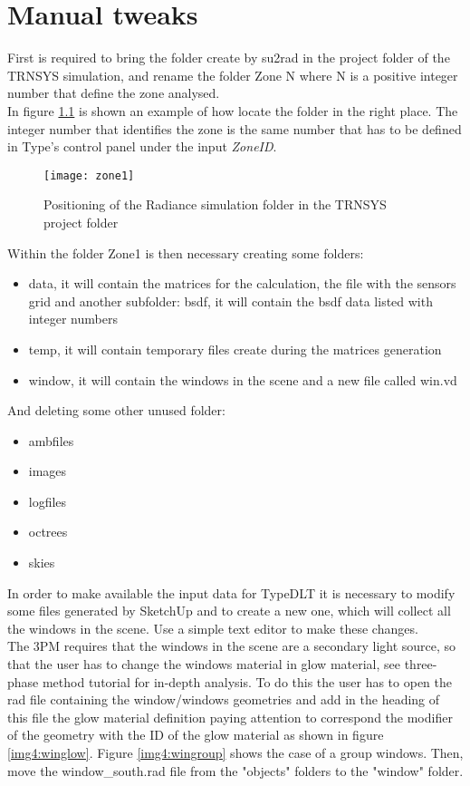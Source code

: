 \chapter{Manual tweaks} \label{sec:manualtweaks}

First is required to bring the folder create by su2rad in the project folder of the TRNSYS simulation, and rename the folder Zone{\color{red} N} where {\color{red} N} is a positive integer number that define the zone analysed.\\
In figure \ref{img4:zone1} is shown an example of how locate the folder in the right place. The integer number that identifies the zone is the same number that has to be defined in Type's control panel under the input \textit{ZoneID}.
\begin{figure}[h]
\centering
\texttt{[image: zone1]}
\caption{\label{img4:zone1} Positioning of the Radiance simulation folder in the TRNSYS project folder}
\end{figure}

Within the folder Zone1 is then necessary creating some folders: 
\begin{itemize}
\renewcommand{\labelitemi}{\tiny$\blacksquare$}
\item {\color{blue} data}, it will contain the matrices for the calculation, the file with the sensors grid and another subfolder:
\subitem{\tiny$\blacksquare$} {\color{blue} bsdf}, it will contain the bsdf data listed with integer numbers
\item {\color{blue} temp}, it will contain temporary files create during the matrices generation
\item {\color{blue} window}, it will contain the windows in the scene and a new file called win.vd
\end{itemize}

And deleting some other unused folder:
\begin{itemize}
\renewcommand{\labelitemi}{\tiny$\blacksquare$}
\item ambfiles
\item images
\item logfiles
\item octrees
\item skies
\end{itemize}

In order to make available the input data for TypeDLT it is necessary to modify some files generated by SketchUp and to create a new one, which will collect all the windows in the scene. Use a simple text editor to make these changes.\\
The 3PM requires that the windows in the scene are a secondary light source, so that the user has to change the windows material in glow material, see three-phase method tutorial for in-depth analysis. To do this the user has to open the rad file containing the window/windows geometries and add in the heading of this file the glow material definition paying attention to correspond the modifier of the geometry with the ID of the glow material as shown in figure \ref{img4:winglow}. Figure \ref{img4:wingroup} shows the case of a group windows. Then, move the window\_south.rad file from the "objects" folders to the "window" folder.

